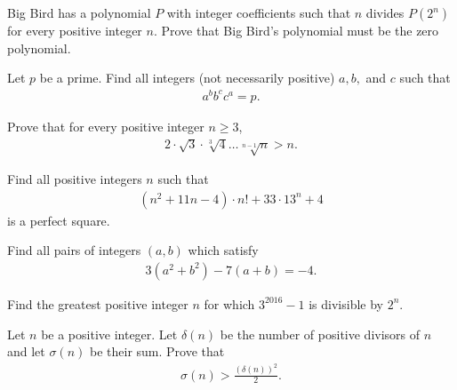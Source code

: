 \documentclass[problems.tex]{subfile}
\begin{document}
	\begin{problem}[ELMO $2016$]
		Big Bird has a polynomial $P$ with integer coefficients such that $n$ divides $P(2^n)$ for every positive integer $n$. Prove that Big Bird's polynomial must be the zero polynomial. %
	\end{problem}




	\begin{problem}
		Let $p$ be a prime. Find all integers (not necessarily positive) $a,b,$ and $c$ such that
		\begin{align*}
			a^bb^cc^a = p.
		\end{align*}
	\end{problem}



	\begin{problem}
		Prove that for every positive integer $n \geq 3$,
		\begin{align*}
			2 \cdot \sqrt 3 \cdot \sqrt[3]{4} \dots \sqrt[n-1]{n} >n.
		\end{align*}
	\end{problem}


	\begin{problem}
		Find all positive integers $n$ such that
		\begin{align*}
			\left(n^2+11n-4\right)\cdot n! + 33 \cdot 13^n + 4
		\end{align*}
		is a perfect square.
	\end{problem}


	\begin{problem}
		Find all pairs of integers $(a, b)$ which satisfy
		\begin{align*}
			3 (a^2 + b^2 ) - 7 (a + b) = -4.
		\end{align*}
	\end{problem}


	\begin{problem}
		Find the greatest positive integer $n$ for which $3^{2016} - 1$ is divisible by $2^n$.
	\end{problem}


	\begin{problem}
		Let $n$ be a positive integer. Let $\delta(n)$ be the number of positive divisors of $n$ and let $\sigma(n)$ be their sum. Prove that
		\begin{align*}
			\sigma(n) > \frac{\left(\delta(n)\right)^2}{2}.
		\end{align*}
	\end{problem}
\end{document}
